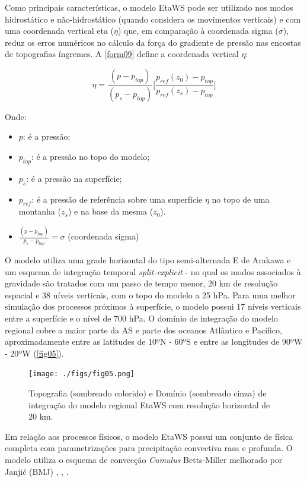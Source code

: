 Como principais características, o modelo EtaWS pode ser utilizado nos modos hidrostático e não-hidrostático (quando considera os movimentos verticais) e com uma coordenada vertical eta ($\eta$) que, em comparação à coordenada sigma ($\sigma$), reduz os erros numéricos no cálculo da força do gradiente de pressão nas encostas de topografias íngremes. A \autoref{form09} define a coordenada vertical $\eta$:

\begin{equation}
\eta=\frac{(p-p_{top})}{(p_{s}-p_{top})}\bigg[\frac{p_{ref}(z_{0})-p_{top}}{p_{ref}(z_{s})-p_{top}}\bigg]
\label{form09}
\end{equation}

Onde:

\begin{itemize}
\item $p$: é a pressão;
\item $p_{top}$: é a pressão no topo do modelo;
\item $p_{s}$: é a pressão na superfície;
\item $p_{ref}$: é a pressão de referência sobre uma superfície $\eta$ no topo de uma montanha ($z_{s}$) e na base da mesma ($z_{0}$).
\item $\frac{(p-p_{top})}{p_{s}-p_{top}}=\sigma$ (coordenada sigma)
\end{itemize}

O modelo utiliza uma grade horizontal do tipo semi-alternada E de Arakawa \cite{arakawalamb77} e um esquema de integração temporal \textit{split-explicit} - no qual os modos associados à gravidade são tratados com um passo de tempo menor, 20 km de resolução espacial e 38 níveis verticais, com o topo do modelo a 25 hPa. Para uma melhor simulação dos processos próximos à superfície, o modelo possui 17 níveis verticais entre a superfície e o nível de 700 hPa. O domínio de integração do modelo regional cobre a maior parte da AS e parte dos oceanos Atlântico e Pacífico, aproximadamente entre as latitudes de 10ºN - 60ºS e entre as longitudes de 90ºW - 20ºW (\autoref{fig05}). 

\begin{figure}
\centering
\texttt{[image: ./figs/fig05.png]}
\caption{Topografia (sombreado colorido) e Domínio (sombreado cinza) de integração do modelo regional EtaWS com resolução horizontal de 20 km.}
\label{fig05}
\end{figure}

Em relação aos processos físicos, o modelo EtaWS possui um conjunto de física completa com parametrizações para precipitação convectiva rasa e profunda. O modelo utiliza o esquema de convecção \textit{Cumulus} Betts-Miller melhorado por Janjić (BMJ) \cite{betts86}, \cite{bettsmiller86}, \cite{janjic94}. 

